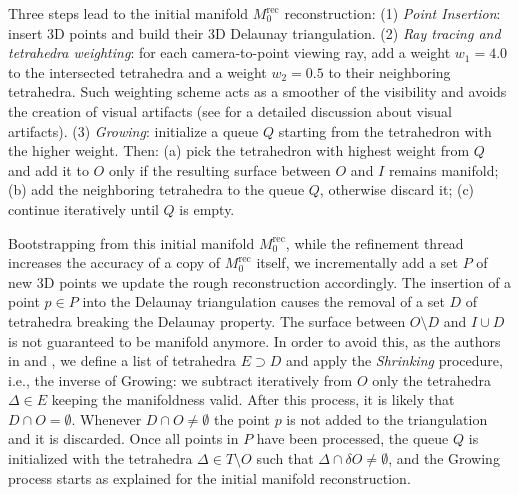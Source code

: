 Three steps lead to the initial manifold $\mathit{M}_{0}^{\text{rec}}$ reconstruction: (1)  \emph{Point Insertion}: insert 3D points and build their 3D Delaunay triangulation. (2) \emph{Ray tracing and tetrahedra weighting}: for each camera-to-point viewing ray, add a weight $w_1 = 4.0$ to the intersected tetrahedra and a weight $w_2=0.5$ to their neighboring tetrahedra.
Such weighting scheme acts as a smoother of the visibility and avoids the creation of visual artifacts (see \cite{litvinov_Lhiuller14} for a detailed discussion about visual artifacts). (3) \emph{Growing}: initialize a queue $Q$ starting from the tetrahedron with the higher weight. 
Then: (a) pick  the tetrahedron with highest weight from $Q$ and add it to $O$ only if the resulting surface between $O$ and $I$ remains manifold; (b) add the neighboring tetrahedra to the queue $Q$, otherwise discard it; (c) continue iteratively until $Q$ is empty.
  


Bootstrapping from this initial manifold $\mathit{M}_{0}^{\text{rec}}$, while the refinement thread increases the accuracy of a copy of $\mathit{M}_{0}^{\text{rec}}$ itself, we incrementally add a  set $P$ of new 3D points we update the rough reconstruction accordingly.
The insertion of a point $p\in P$  into the Delaunay triangulation causes the removal of a set $D$ of tetrahedra breaking the Delaunay property. The surface between $O \setminus D$ and $I \cup D$ is not guaranteed to be manifold anymore. 
In order to avoid this, as the authors in \cite{litvinov_lhuillier_13} and \cite{romanoni15a}, we define a list of tetrahedra $E \supset D$ and apply the \emph{Shrinking} procedure, i.e., the inverse of Growing:  we subtract iteratively from $O$ only the tetrahedra  $\Delta \in E$ keeping the manifoldness valid.
After this process, it is likely that $D \cap O = \emptyset$.
Whenever $D \cap O \neq \emptyset$ the point $p$ is not added to the triangulation and it is discarded.
Once all points in $P$ have been processed, the queue $Q$ is initialized with the tetrahedra $\Delta \in T \setminus O$ such that  $\Delta \cap \delta O \neq \emptyset$, and the Growing process starts as explained for the initial manifold reconstruction.

